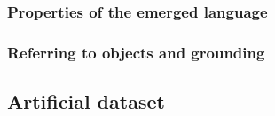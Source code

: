 
\subsubsection{Properties of the emerged language}
\label{sec:properties-el}


\subsubsection{Referring to objects and grounding}
\label{sec:referring}

\subsection{Artificial dataset}
